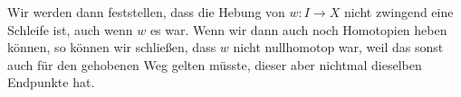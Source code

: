 \begin{oral}[ca.]
    Wir werden dann feststellen, dass die Hebung von $w\colon  I \to  X$ nicht zwingend eine Schleife ist, auch wenn $w$ es war. Wenn wir dann auch noch Homotopien heben können, so können wir schließen, dass  $w$ nicht nullhomotop war, weil das sonst auch für den gehobenen Weg gelten müsste, dieser aber nichtmal dieselben Endpunkte hat.
\end{oral}
